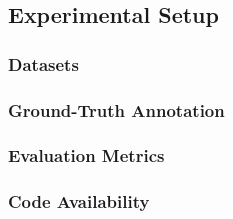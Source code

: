 

\subsection{Experimental Setup}
\label{sec:exp_setup}


\subsubsection{Datasets}
\label{sec:datasets}


\subsubsection{Ground-Truth Annotation}
\label{sec:annotation}


\subsubsection{Evaluation Metrics}
\label{sec:metrics}


\subsubsection{Code Availability}
\label{sec:code_availability}


%





